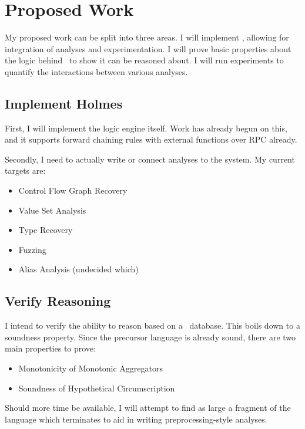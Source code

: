 \chapter{Proposed Work}
My proposed work can be split into three areas.
I will implement \sysname, allowing for integration of analyses and experimentation.
I will prove basic properties about the logic behind \sysname\ to show it can be reasoned about.
I will run experiments to quantify the interactions between various analyses.

\section{Implement Holmes}
First, I will implement the logic engine itself.
Work has already begun on this, and it supports forward chaining rules with external functions over RPC already.

Secondly, I need to actually write or connect analyses to the system.
My current targets are:
\begin{itemize}
        \item Control Flow Graph Recovery
        \item Value Set Analysis\cite{vsa}
        \item Type Recovery\cite{bitr}
        \item Fuzzing
        \item Alias Analysis (undecided which)
\end{itemize}

\section{Verify Reasoning}
I intend to verify the ability to reason based on a \sysname\ database.
This boils down to a soundness property.
Since the precursor language is already sound, there are two main properties to prove:
\begin{itemize}
        \item Monotonicity of Monotonic Aggregators
        \item Soundness of Hypothetical Circumscription
\end{itemize}

Should more time be available, I will attempt to find as large a fragment of the language which terminates to aid in writing preprocessing-style analyses.


